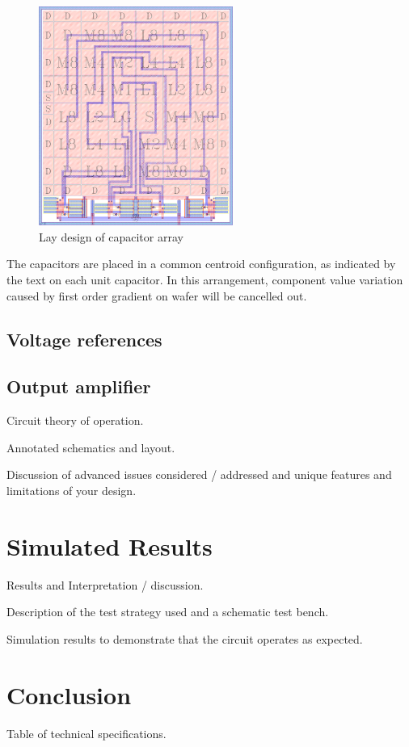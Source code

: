 \documentclass[journal]{IEEEtran}
\begin{document}
\begin{figure}[!t]
	\centering
	\includegraphics[width=2.5in]{cap_lay_4x}
	\caption{Lay design of capacitor array}
	\label{fig_cap_lay}
\end{figure}

The capacitors are placed in a common centroid configuration, as indicated by the text on each unit capacitor. In this arrangement, component value variation caused by first order gradient on wafer will be cancelled out.

\subsection{Voltage references}

\subsection{Output amplifier}

Circuit theory of operation.

Annotated schematics and layout.

Discussion of advanced issues considered / addressed and unique features and limitations of your design.

\section{Simulated Results}

Results and Interpretation / discussion.

Description of the test strategy used and a schematic test bench.

Simulation results to demonstrate that the circuit operates as expected.

\section{Conclusion}

Table of technical specifications.


\end{document}
